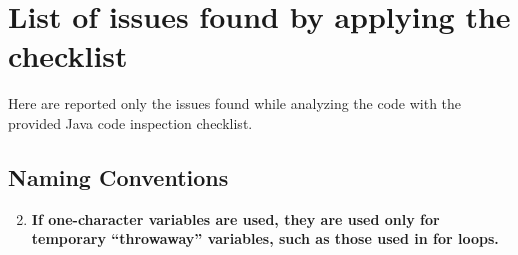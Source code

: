 \documentclass[a4paper,11pt]{report} %
\begin{document}
	
	
	
	\section{List of issues found by applying the checklist} Here are reported only the issues found while analyzing the code with the provided Java code inspection checklist.
		\subsection*{Naming Conventions}\begin{enumerate}[resume]
			\setcounter{enumi}{1}	
			\item \textbf{If one-character variables are used, they are used only for temporary ``throwaway'' variables, such as those used in for loops.}\smallskip \\
%				
			\setcounter{enumi}{7}
		\end{enumerate}
		
\end{document}
